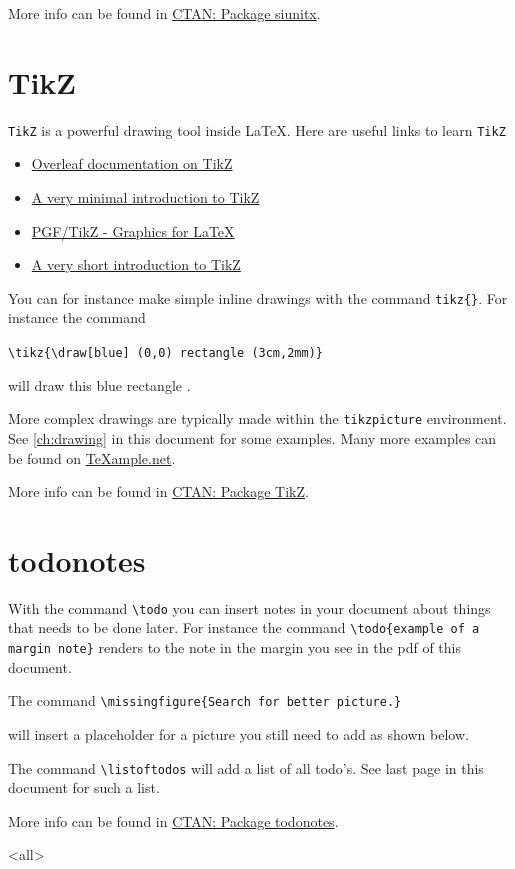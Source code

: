 More info can be found in \href{https://ctan.org/pkg/siunitx?lang=en}{CTAN: Package siunitx}.


\section{TikZ}\label{sec:tikz}
\verb|TikZ| is a powerful drawing tool inside \LaTeX. Here are useful links to learn \verb|TikZ|
\begin{itemize}
    \item \href{https://www.overleaf.com/learn/latex/TikZ_package}{Overleaf documentation on TikZ}
    \item \href{https://cremeronline.com/LaTeX/minimaltikz.pdf}{A very minimal introduction to TikZ}
    \item \href{https://www.math.uni-leipzig.de/~hellmund/LaTeX/pgf-tut.pdf}{PGF/TikZ - Graphics for \LaTeX} 
    \item \href{http://siam.cs.kuleuven.be/sites/siam.cs.kuleuven.be/files/events/tikz_workshop/tikz_introduction.pdf}{A very short introduction to TikZ} 
    
\end{itemize}

You can for instance make simple inline drawings with the command \verb|tikz{}|. For instance the command

\verb|\tikz{\draw[blue] (0,0) rectangle (3cm,2mm)}|

will draw this blue rectangle .

More complex drawings are typically made within the \verb|tikzpicture| environment. See \cref{ch:drawing} in this document for some examples. Many more examples can be found on \href{http://www.texample.net/tikz/examples/}{TeXample.net}.

More info can be found in \href{https://ctan.org/pkg/tikz?lang=en}{CTAN: Package TikZ}.

\section{todonotes}\label{sec:todonotes}
With the command \verb|\todo| you can insert notes in your document about things that needs to be
done later. For instance the command \verb|\todo{example of a margin note}| renders to the note in the margin you see in the pdf of this document.

The command \verb|\missingfigure{Search for better picture.}|

will insert a placeholder for a picture you still need to add as shown below.

The command \verb|\listoftodos| will add a list of all todo's. See last page in this document for such a list.

More info can be found in \href{https://ctan.org/pkg/todonotes?lang=en}{CTAN: Package todonotes}.

\mode<all> 
